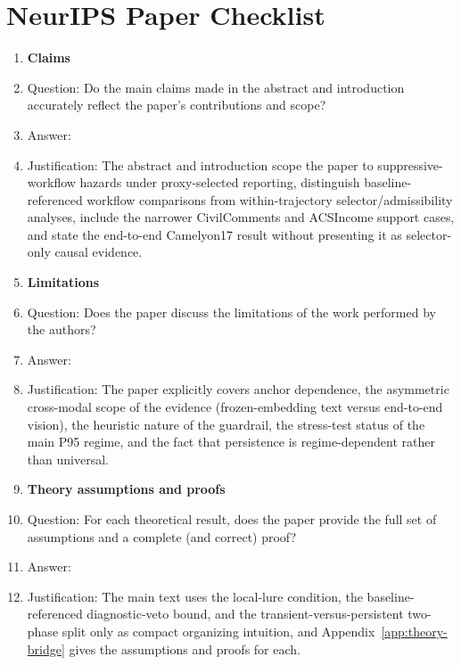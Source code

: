 \section*{NeurIPS Paper Checklist}

\begin{enumerate}

\item {\bf Claims}
  \item[] Question: Do the main claims made in the abstract and introduction accurately reflect the paper's contributions and scope?
  \item[] Answer: \answerYes{}
  \item[] Justification: The abstract and introduction scope the paper to suppressive-workflow hazards under proxy-selected reporting, distinguish baseline-referenced workflow comparisons from within-trajectory selector/admissibility analyses, include the narrower CivilComments and ACSIncome support cases, and state the end-to-end Camelyon17 result without presenting it as selector-only causal evidence.

\item {\bf Limitations}
  \item[] Question: Does the paper discuss the limitations of the work performed by the authors?
  \item[] Answer: \answerYes{}
  \item[] Justification: The paper explicitly covers anchor dependence, the asymmetric cross-modal scope of the evidence (frozen-embedding text versus end-to-end vision), the heuristic nature of the guardrail, the stress-test status of the main P95 regime, and the fact that persistence is regime-dependent rather than universal.

\item {\bf Theory assumptions and proofs}
  \item[] Question: For each theoretical result, does the paper provide the full set of assumptions and a complete (and correct) proof?
  \item[] Answer: \answerYes{}
  \item[] Justification: The main text uses the local-lure condition, the baseline-referenced diagnostic-veto bound, and the transient-versus-persistent two-phase split only as compact organizing intuition, and Appendix~\ref{app:theory-bridge} gives the assumptions and proofs for each.


\end{enumerate}
